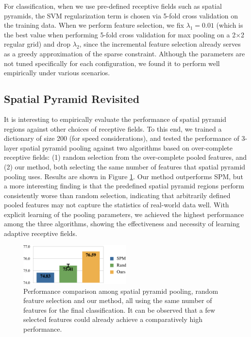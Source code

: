 For classification, when we use pre-defined receptive fields such as spatial pyramids, the SVM regularization term is chosen via 5-fold cross validation on the training data. When we perform feature selection, we fix $\lambda_1 = 0.01$ (which is the best value when performing 5-fold cross validation for max pooling on a 2$\times$2 regular grid) and drop $\lambda_2$, since the incremental feature selection already serves as a greedy approximation of the sparse constraint. Although the parameters are not tuned specifically for each configuration, we found it to perform well empirically under various scenarios.

\subsection{Spatial Pyramid Revisited}
It is interesting to empirically evaluate the performance of spatial pyramid regions against other choices of receptive fields. To this end, we trained a dictionary of size 200 (for speed considerations), and tested the performance of 3-layer spatial pyramid pooling against two algorithms based on over-complete receptive fields: (1) random selection from the over-complete pooled features, and (2) our method, both selecting the same number of features that spatial pyramid pooling uses. Results are shown in Figure \ref{fig:spmvsrandomvsgraft}. Our method outperforms SPM, but a more interesting finding is that the predefined spatial pyramid regions perform consistently worse than random selection, indicating that arbitrarily defined pooled features may not capture the statistics of real-world data well. With explicit learning of the pooling parameters, we achieved the highest performance among the three algorithms, showing the effectiveness and necessity of learning adaptive receptive fields.

\begin{figure}
  \centering
  \includegraphics[width=0.5\textwidth]{figs/smartpooling/perfcomparison.pdf}
  \caption{Performance comparison among spatial pyramid pooling, random feature selection and our method, all using the same number of features for the final classification. It can be observed that a few selected features could already achieve a comparatively high performance.}\label{fig:spmvsrandomvsgraft}
\end{figure}

